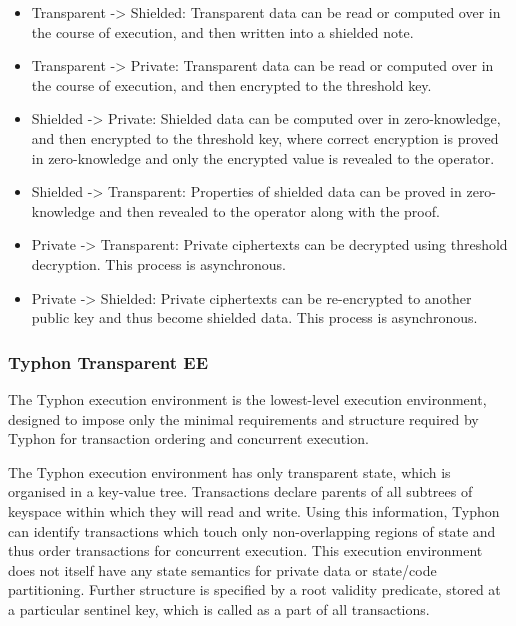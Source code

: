 \begin{itemize}
\tightlist
\item
  Transparent -\textgreater{} Shielded: Transparent data can be read or
  computed over in the course of execution, and then written into a
  shielded note.
\item
  Transparent -\textgreater{} Private: Transparent data can be read or
  computed over in the course of execution, and then encrypted to the
  threshold key.
\item
  Shielded -\textgreater{} Private: Shielded data can be computed over
  in zero-knowledge, and then encrypted to the threshold key, where
  correct encryption is proved in zero-knowledge and only the encrypted
  value is revealed to the operator.
\item
  Shielded -\textgreater{} Transparent: Properties of shielded data can
  be proved in zero-knowledge and then revealed to the operator along
  with the proof.
\item
  Private -\textgreater{} Transparent: Private ciphertexts can be
  decrypted using threshold decryption. This process is asynchronous.
\item
  Private -\textgreater{} Shielded: Private ciphertexts can be
  re-encrypted to another public key and thus become shielded data. This
  process is asynchronous.
\end{itemize}

\subsubsection{Typhon Transparent EE}\label{typhon-transparent-ee}

The Typhon execution environment is the lowest-level execution
environment, designed to impose only the minimal requirements and
structure required by Typhon for transaction ordering and concurrent
execution.

The Typhon execution environment has only transparent state, which is
organised in a key-value tree. Transactions declare parents of all
subtrees of keyspace within which they will read and write. Using this
information, Typhon can identify transactions which touch only
non-overlapping regions of state and thus order transactions for
concurrent execution. This execution environment does not itself have
any state semantics for private data or state/code partitioning. Further
structure is specified by a root validity predicate, stored at a
particular sentinel key, which is called as a part of all transactions.

